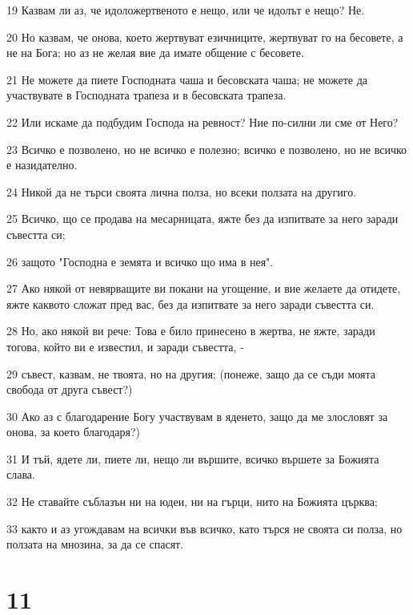 \par 19 Казвам ли аз, че идоложертвеното е нещо, или че идолът е нещо? Не.
\par 20 Но казвам, че онова, което жертвуват езичниците, жертвуват го на бесовете, а не на Бога; но аз не желая вие да имате общение с бесовете.
\par 21 Не можете да пиете Господната чаша и бесовската чаша; не можете да участвувате в Господната трапеза и в бесовската трапеза.
\par 22 Или искаме да подбудим Господа на ревност? Ние по-силни ли сме от Него?
\par 23 Всичко е позволено, но не всичко е полезно; всичко е позволено, но не всичко е назидателно.
\par 24 Никой да не търси своята лична полза, но всеки ползата на другиго.
\par 25 Всичко, що се продава на месарницата, яжте без да изпитвате за него заради съвестта си;
\par 26 защото "Господна е земята и всичко що има в нея".
\par 27 Ако някой от невярващите ви покани на угощение, и вие желаете да отидете, яжте каквото сложат пред вас, без да изпитвате за него заради съвестта си.
\par 28 Но, ако някой ви рече: Това е било принесено в жертва, не яжте, заради тогова, който ви е известил, и заради съвестта, -
\par 29 съвест, казвам, не твоята, но на другия; (понеже, защо да се съди моята свобода от друга съвест?)
\par 30 Ако аз с благодарение Богу участвувам в яденето, защо да ме злословят за онова, за което благодаря?)
\par 31 И тъй, ядете ли, пиете ли, нещо ли вършите, всичко вършете за Божията слава.
\par 32 Не ставайте съблазън ни на юдеи, ни на гърци, нито на Божията църква;
\par 33 както и аз угождавам на всички във всичко, като търся не своята си полза, но ползата на мнозина, за да се спасят.

\chapter{11}

